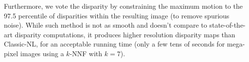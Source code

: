 Furthermore, we vote the disparity by constraining the maximum motion to the 97.5 percentile of disparities within the resulting image (to remove spurious noise).
While such method is not as smooth and doesn't compare to state-of-the-art disparity computations, it produces higher resolution disparity maps than Classic-NL, for an acceptable running time (only a few tens of seconds for mega-pixel images using a $k$-NNF with $k=7$).